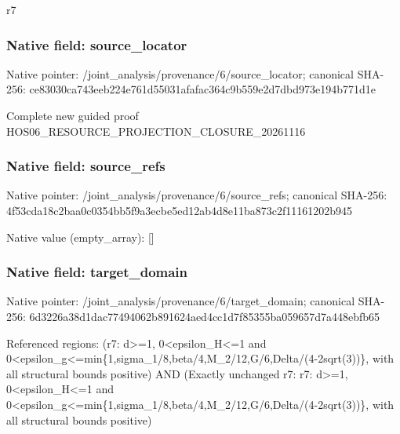 \documentclass[10pt,a4paper]{article}
\begin{document}
\begingroup\raggedright\sloppy r7\par\endgroup

\subsubsection{Native field: source\_\allowbreak{}locator}
Native pointer: /joint\_\allowbreak{}analysis/provenance/6/source\_\allowbreak{}locator; canonical SHA-256: ce83030ca743eeb224e761d55031afafac364c9b559e2d7dbd973e194b771d1e

\begingroup\raggedright\sloppy Complete new guided proof HOS06\_\allowbreak{}RESOURCE\_\allowbreak{}PROJECTION\_\allowbreak{}CLOSURE\_\allowbreak{}20261116\par\endgroup

\subsubsection{Native field: source\_\allowbreak{}refs}
Native pointer: /joint\_\allowbreak{}analysis/provenance/6/source\_\allowbreak{}refs; canonical SHA-256: 4f53cda18c2baa0c0354bb5f9a3ecbe5ed12ab4d8e11ba873c2f11161202b945

Native value (empty\_\allowbreak{}array): []

\subsubsection{Native field: target\_\allowbreak{}domain}
Native pointer: /joint\_\allowbreak{}analysis/provenance/6/target\_\allowbreak{}domain; canonical SHA-256: 6d3226a38d1dac77494062b891624aed4cc1d7f85355ba059657d7a448ebfb65

\begingroup\raggedright\sloppy Referenced regions:\allowbreak{} (r7:\allowbreak{} d>=\allowbreak{}1,\allowbreak{} 0<epsilon\_\allowbreak{}H<=\allowbreak{}1 and 0<epsilon\_\allowbreak{}g<=\allowbreak{}min\{1,\allowbreak{}sigma\_\allowbreak{}1/\allowbreak{}8,\allowbreak{}beta/\allowbreak{}4,\allowbreak{}M\_\allowbreak{}2/\allowbreak{}12,\allowbreak{}G/\allowbreak{}6,\allowbreak{}Delta/\allowbreak{}(4-2sqrt(3))\},\allowbreak{} with all structural bounds positive) AND (Exactly unchanged r7:\allowbreak{} r7:\allowbreak{} d>=\allowbreak{}1,\allowbreak{} 0<epsilon\_\allowbreak{}H<=\allowbreak{}1 and 0<epsilon\_\allowbreak{}g<=\allowbreak{}min\{1,\allowbreak{}sigma\_\allowbreak{}1/\allowbreak{}8,\allowbreak{}beta/\allowbreak{}4,\allowbreak{}M\_\allowbreak{}2/\allowbreak{}12,\allowbreak{}G/\allowbreak{}6,\allowbreak{}Delta/\allowbreak{}(4-2sqrt(3))\},\allowbreak{} with all structural bounds positive)\par\endgroup
\end{document}
